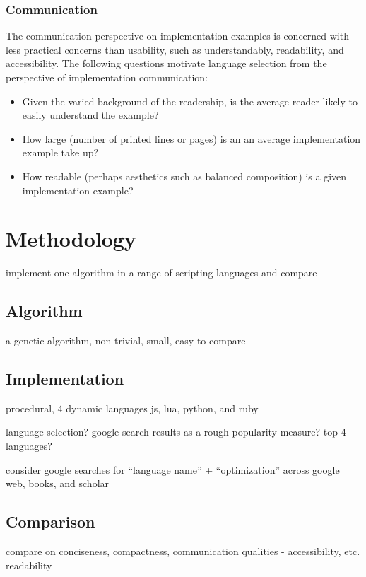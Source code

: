 \documentclass[a4paper, 11pt]{article}
\begin{document}
\subsubsection{Communication}
The communication perspective on implementation examples is concerned with less practical concerns than usability, such as understandably, readability, and accessibility. The following questions motivate language selection from the perspective of implementation communication:

\begin{itemize}
	\item Given the varied background of the readership, is the average reader likely to easily understand the example?
	\item How large (number of printed lines or pages) is an an average implementation example take up?
	\item How readable (perhaps aesthetics such as balanced composition) is a given implementation example?	
\end{itemize}

% 
%
\section{Methodology}
\label{sec:methodology}

implement one algorithm in a range of scripting languages and compare

% 
% 
\subsection{Algorithm}
a genetic algorithm, non trivial, small, easy to compare


% 
% 
\subsection{Implementation}
procedural, 4 dynamic languages
js, lua, python, and ruby


language selection? google search results as a rough popularity measure?
top 4 languages?

consider google searches for ``language name'' + ``optimization'' across google web, books, and scholar


% 
% 
\subsection{Comparison}
compare on conciseness, compactness, communication qualities - accessibility, etc. readability
\end{document}
